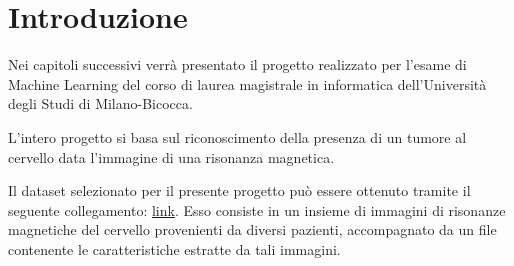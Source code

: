 \chapter{Introduzione}
Nei capitoli successivi verrà presentato il progetto realizzato per l'esame di
Machine Learning del corso di laurea magistrale in informatica dell'Università
degli Studi di Milano-Bicocca.

L'intero progetto si basa sul riconoscimento della presenza di un tumore al
cervello data l'immagine di una risonanza magnetica.


Il dataset selezionato per il presente progetto può essere ottenuto tramite il
seguente collegamento: \href{https://www.kaggle.com/datasets/jakeshbohaju/brain-tumor/data}{link}.
Esso consiste in un insieme di immagini di risonanze magnetiche del cervello
provenienti da diversi pazienti, accompagnato da un file contenente le
caratteristiche estratte da tali immagini.

